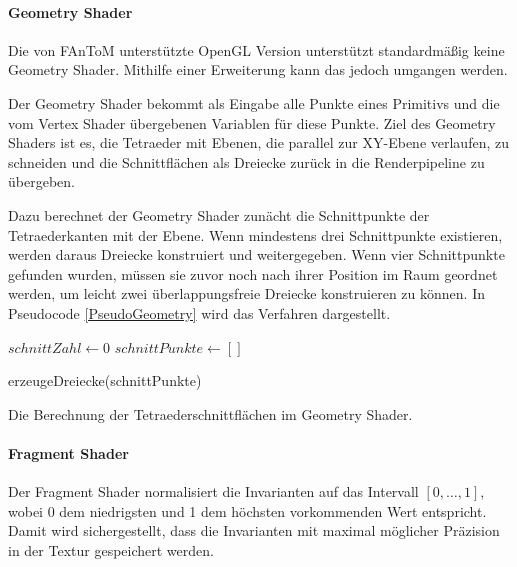 \documentclass[a4paper,fontsize=12pt,toc=bib,halfparskip]{scrartcl}
\begin{document}
\paragraph{Geometry Shader}
Die von FAnToM unterst\"utzte OpenGL Version unterst\"utzt standardm\"a{\ss}ig keine Geometry Shader. Mithilfe einer Erweiterung kann das jedoch umgangen werden.

Der Geometry Shader bekommt als Eingabe alle Punkte eines Primitivs und die vom Vertex Shader \"ubergebenen Variablen f\"ur diese Punkte. Ziel des Geometry Shaders ist es, die Tetraeder mit Ebenen, die parallel zur XY-Ebene verlaufen, zu schneiden und die Schnittfl\"achen als Dreiecke zur\"uck in die Renderpipeline zu \"ubergeben.

Dazu berechnet der Geometry Shader zun\"acht die Schnittpunkte der Tetraederkanten mit der Ebene. Wenn mindestens drei Schnittpunkte existieren, werden  daraus Dreiecke konstruiert und weitergegeben. Wenn vier Schnittpunkte gefunden wurden, m\"ussen sie zuvor noch nach ihrer Position im Raum geordnet werden, um leicht zwei \"uberlappungsfreie Dreiecke konstruieren zu k\"onnen. In Pseudocode \ref{PseudoGeometry} wird das Verfahren dargestellt.

\begin{algorithm}
	$schnittZahl \gets 0$\;
	$schnittPunkte \gets []$\;
	
	erzeugeDreiecke(schnittPunkte)\;
	\vspace{0.5cm}
	\caption{Die Berechnung der Tetraederschnittfl\"achen im Geometry Shader.}
	\label{PseudoGeometry}
\end{algorithm}

\paragraph{Fragment Shader}
Der Fragment Shader normalisiert die Invarianten auf das Intervall $[0,\dots,1]$, wobei 0 dem niedrigsten und 1 dem h\"ochsten vorkommenden Wert entspricht. Damit wird sichergestellt, dass die Invarianten mit maximal m\"oglicher Pr\"azision in der Textur gespeichert werden.
\end{document}
